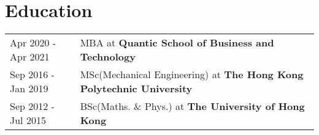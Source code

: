 \documentclass[a4paper,12pt]{article}
\begin{document}
\section{Education}
\begin{tabularx}{\linewidth}{@{}l X@{}}	
Apr 2020 - Apr 2021 & MBA at  \textbf{Quantic School of Business and Technology} \\

Sep 2016 - Jan 2019 & MSc(Mechanical Engineering) at \textbf{The Hong Kong Polytechnic University} \\ 

Sep 2012 - Jul 2015 & BSc(Maths. \& Phys.) at \textbf{The University of Hong Kong} \\

\end{tabularx}


\end{document}
